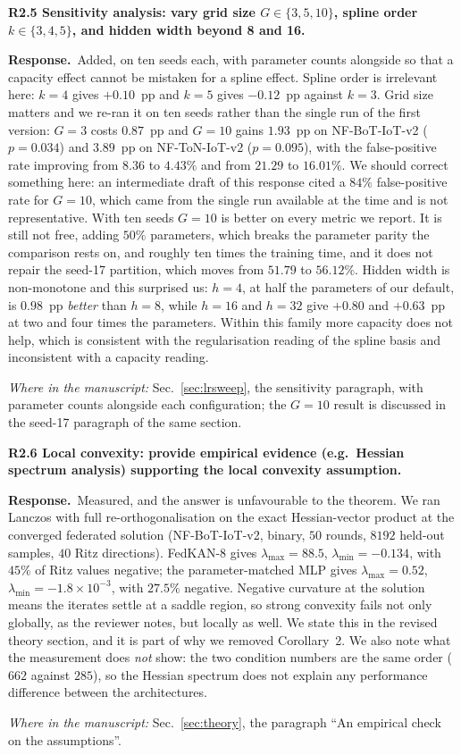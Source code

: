 \documentclass[11pt]{article}
\newcommand{\rc}[1]{\medskip\noindent\textbf{\textcolor[rgb]{0.35,0.35,0.35}{#1}}\par\nopagebreak}
\newcommand{\reply}{\medskip\noindent\textbf{Response.}\ }
\newcommand{\where}[1]{\par\smallskip\noindent\emph{Where in the manuscript:} #1\par}
\begin{document}
\rc{R2.5 Sensitivity analysis: vary grid size $G \in \{3,5,10\}$, spline order
$k \in \{3,4,5\}$, and hidden width beyond 8 and 16.}
\reply Added, on ten seeds each, with parameter counts alongside so that a capacity effect cannot be
mistaken for a spline effect. Spline order is irrelevant here: $k{=}4$ gives $+0.10$~pp and
$k{=}5$ gives $-0.12$~pp against $k{=}3$. Grid size matters and we re-ran it on ten seeds rather than the single run of the
first version: $G{=}3$ costs $0.87$~pp and $G{=}10$ gains $1.93$~pp on NF-BoT-IoT-v2
($p=0.034$) and $3.89$~pp on NF-ToN-IoT-v2 ($p=0.095$), with the false-positive rate improving
from $8.36$ to $4.43\%$ and from $21.29$ to $16.01\%$. We should correct something here: an
intermediate draft of this response cited a $84\%$ false-positive rate for $G{=}10$, which came
from the single run available at the time and is not representative. With ten seeds $G{=}10$ is
better on every metric we report. It is still not free, adding $50\%$ parameters, which breaks
the parameter parity the comparison rests on, and roughly ten times the training time, and it
does not repair the seed-17 partition, which moves from $51.79$ to $56.12\%$. Hidden width is
non-monotone and this surprised us: $h{=}4$, at half the parameters of our default, is
$0.98$~pp \emph{better} than $h{=}8$, while $h{=}16$ and $h{=}32$ give $+0.80$ and $+0.63$~pp
at two and four times the parameters. Within this family more capacity does not help, which is
consistent with the regularisation reading of the spline basis and inconsistent with a
capacity reading.
\where{Sec.~\ref{sec:lrsweep}, the sensitivity paragraph, with parameter counts alongside each configuration; the $G{=}10$ result is discussed in the seed-17 paragraph of the same section.}

\rc{R2.6 Local convexity: provide empirical evidence (e.g.\ Hessian spectrum analysis)
supporting the local convexity assumption.}
\reply Measured, and the answer is unfavourable to the theorem. We ran Lanczos with full
re-orthogonalisation on the exact Hessian-vector product at the converged federated solution
(NF-BoT-IoT-v2, binary, $50$ rounds, $8192$ held-out samples, $40$ Ritz directions). FedKAN-8
gives $\lambda_{\max}=88.5$, $\lambda_{\min}=-0.134$, with $45\%$ of Ritz values negative;
the parameter-matched MLP gives $\lambda_{\max}=0.52$, $\lambda_{\min}=-1.8\times10^{-3}$,
with $27.5\%$ negative. Negative curvature at the solution means the iterates settle at a
saddle region, so strong convexity fails not only globally, as the reviewer notes, but locally
as well. We state this in the revised theory section, and it is part of why we removed
Corollary~2. We also note what the measurement does \emph{not} show: the two condition numbers
are the same order ($662$ against $285$), so the Hessian spectrum does not explain any
performance difference between the architectures.
\where{Sec.~\ref{sec:theory}, the paragraph ``An empirical check on the assumptions''.}
\end{document}
